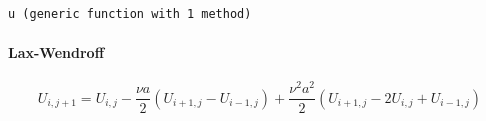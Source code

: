 \documentclass[11pt]{article}
\makeatletter
\newcommand{\boxspacing}{\kern\kvtcb@left@rule\kern\kvtcb@boxsep}
\newcommand{\prompt}[4]{
        {\ttfamily\llap{{\color{#2}[#3]:\hspace{3pt}#4}}\vspace{-\baselineskip}}
    }
\makeatother
\begin{document}
            \begin{tcolorbox}[breakable, size=fbox, boxrule=.5pt, pad at break*=1mm, opacityfill=0]
\prompt{Out}{outcolor}{ }{\boxspacing}
\begin{Verbatim}[commandchars=\\\{\}]
u (generic function with 1 method)
\end{Verbatim}
\end{tcolorbox}
        
    \hypertarget{lax-wendroff}{%
\paragraph{Lax-Wendroff}}

     

    \[U_{i,j+1} = U_{i,j} - \frac{\nu a}2( U_{i+1,j} -   U_{i-1,j}) + \frac{\nu^2 a^2}2( U_{i+1,j} -2 U_{i,j} + U_{i-1,j})\]
\end{document}
